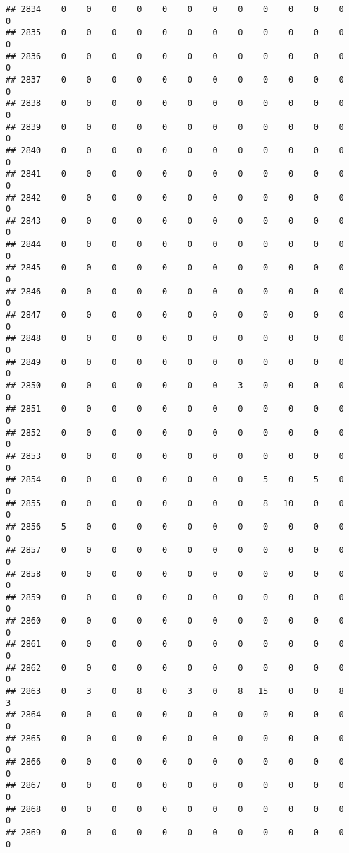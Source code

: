 \documentclass[]{article}
\begin{document}
\begin{verbatim}
## 2834    0    0    0    0    0    0    0    0    0    0    0    0    0
## 2835    0    0    0    0    0    0    0    0    0    0    0    0    0
## 2836    0    0    0    0    0    0    0    0    0    0    0    0    0
## 2837    0    0    0    0    0    0    0    0    0    0    0    0    0
## 2838    0    0    0    0    0    0    0    0    0    0    0    0    0
## 2839    0    0    0    0    0    0    0    0    0    0    0    0    0
## 2840    0    0    0    0    0    0    0    0    0    0    0    0    0
## 2841    0    0    0    0    0    0    0    0    0    0    0    0    0
## 2842    0    0    0    0    0    0    0    0    0    0    0    0    0
## 2843    0    0    0    0    0    0    0    0    0    0    0    0    0
## 2844    0    0    0    0    0    0    0    0    0    0    0    0    0
## 2845    0    0    0    0    0    0    0    0    0    0    0    0    0
## 2846    0    0    0    0    0    0    0    0    0    0    0    0    0
## 2847    0    0    0    0    0    0    0    0    0    0    0    0    0
## 2848    0    0    0    0    0    0    0    0    0    0    0    0    0
## 2849    0    0    0    0    0    0    0    0    0    0    0    0    0
## 2850    0    0    0    0    0    0    0    3    0    0    0    0    0
## 2851    0    0    0    0    0    0    0    0    0    0    0    0    0
## 2852    0    0    0    0    0    0    0    0    0    0    0    0    0
## 2853    0    0    0    0    0    0    0    0    0    0    0    0    0
## 2854    0    0    0    0    0    0    0    0    5    0    5    0    0
## 2855    0    0    0    0    0    0    0    0    8   10    0    0    0
## 2856    5    0    0    0    0    0    0    0    0    0    0    0    0
## 2857    0    0    0    0    0    0    0    0    0    0    0    0    0
## 2858    0    0    0    0    0    0    0    0    0    0    0    0    0
## 2859    0    0    0    0    0    0    0    0    0    0    0    0    0
## 2860    0    0    0    0    0    0    0    0    0    0    0    0    0
## 2861    0    0    0    0    0    0    0    0    0    0    0    0    0
## 2862    0    0    0    0    0    0    0    0    0    0    0    0    0
## 2863    0    3    0    8    0    3    0    8   15    0    0    8    3
## 2864    0    0    0    0    0    0    0    0    0    0    0    0    0
## 2865    0    0    0    0    0    0    0    0    0    0    0    0    0
## 2866    0    0    0    0    0    0    0    0    0    0    0    0    0
## 2867    0    0    0    0    0    0    0    0    0    0    0    0    0
## 2868    0    0    0    0    0    0    0    0    0    0    0    0    0
## 2869    0    0    0    0    0    0    0    0    0    0    0    0    0

\end{verbatim}
\end{document}
